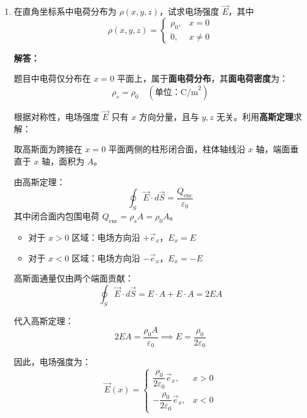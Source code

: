 \begin{enumerate}[label=\arabic*.]
\vspace{0.5em}
(3) 已知点 \(P(1,2,-4)\) 处电位为 2V：
\[
\varphi_P = -2(1)^3 - 3(2)^2 - 4(-4) + C = -2 - 12 + 16 + C = 2 + C = 2\ \text{V}
\]

解得 \(C=0\)。
则 \(N\) 点电位：
\[
\varphi_N = -2(-3)^3 - 3(-3)^2 - 4(2) = 54 - 27 - 8 = 19\ \text{V}
\]

\vspace{1em}

\item 在直角坐标系中电荷分布为 \(\rho(x,y,z)\)，试求电场强度 \(\vec{E}\)，其中
\[
\rho(x,y,z) =
\begin{cases}
\rho_0, & x = 0 \\
0, & x \neq 0
\end{cases}
\]

\textbf{解答：}

题目中电荷仅分布在 \(x=0\) 平面上，属于\textbf{面电荷分布}，其\textbf{面电荷密度}为：
\[
\rho_s = \rho_0 \quad (\text{单位：C/m}^2)
\]

根据对称性，电场强度 \(\vec{E}\) 只有 \(x\) 方向分量，且与 \(y,z\) 无关。利用\textbf{高斯定理}求解：

取高斯面为跨接在 \(x=0\) 平面两侧的柱形闭合面，柱体轴线沿 \(x\) 轴，端面垂直于 \(x\) 轴，面积为 \(A\)。

由高斯定理：
\[
\oint_S \vec{E} \cdot d\vec{S} = \frac{Q_{\text{enc}}}{\varepsilon_0}
\]
其中闭合面内包围电荷 \(Q_{\text{enc}} = \rho_s A = \rho_0 A\)。

\begin{itemize}
    \item 对于 \(x>0\) 区域：电场方向沿 \(+\vec{e}_x\)，\(E_x = E\)
    \item 对于 \(x<0\) 区域：电场方向沿 \(-\vec{e}_x\)，\(E_x = -E\)
\end{itemize}

高斯面通量仅由两个端面贡献：
\[
\oint_S \vec{E} \cdot d\vec{S} = E \cdot A + E \cdot A = 2EA
\]

代入高斯定理：
\[
2EA = \frac{\rho_0 A}{\varepsilon_0} \implies E = \frac{\rho_0}{2\varepsilon_0}
\]

因此，电场强度为：
\[
\vec{E}(x) =
\begin{cases}
\dfrac{\rho_0}{2\varepsilon_0} \vec{e}_x, & x > 0 \\
-\dfrac{\rho_0}{2\varepsilon_0} \vec{e}_x, & x < 0
\end{cases}
\]

\vspace{1em}


\end{enumerate}
